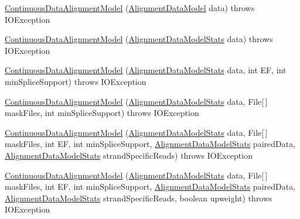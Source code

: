 \begin{DoxyCompactItemize}
\item 
\hyperlink{classbroad_1_1pda_1_1seq_1_1segmentation_1_1_continuous_data_alignment_model_a6fa2acc5a5e70dcb0b7d9f36c35c5f57}{Continuous\+Data\+Alignment\+Model} (\hyperlink{interfacebroad_1_1pda_1_1seq_1_1segmentation_1_1_alignment_data_model}{Alignment\+Data\+Model} data)  throws I\+O\+Exception
\item 
\hyperlink{classbroad_1_1pda_1_1seq_1_1segmentation_1_1_continuous_data_alignment_model_a954fd7962b745c8952dc27204ebe6252}{Continuous\+Data\+Alignment\+Model} (\hyperlink{classbroad_1_1pda_1_1seq_1_1segmentation_1_1_alignment_data_model_stats}{Alignment\+Data\+Model\+Stats} data)  throws I\+O\+Exception
\item 
\hyperlink{classbroad_1_1pda_1_1seq_1_1segmentation_1_1_continuous_data_alignment_model_adec2aa3724e353ed1f7678e17cb8e74a}{Continuous\+Data\+Alignment\+Model} (\hyperlink{classbroad_1_1pda_1_1seq_1_1segmentation_1_1_alignment_data_model_stats}{Alignment\+Data\+Model\+Stats} data, int E\+F, int min\+Splice\+Support)  throws I\+O\+Exception
\item 
\hyperlink{classbroad_1_1pda_1_1seq_1_1segmentation_1_1_continuous_data_alignment_model_a3cbdd60567c630a9741fb1b187aa8f2b}{Continuous\+Data\+Alignment\+Model} (\hyperlink{classbroad_1_1pda_1_1seq_1_1segmentation_1_1_alignment_data_model_stats}{Alignment\+Data\+Model\+Stats} data, File\mbox{[}$\,$\mbox{]} mask\+Files, int min\+Splice\+Support)  throws I\+O\+Exception
\item 
\hyperlink{classbroad_1_1pda_1_1seq_1_1segmentation_1_1_continuous_data_alignment_model_ad0d8dfa7ae363e2d07df5fd31ac3b3e2}{Continuous\+Data\+Alignment\+Model} (\hyperlink{classbroad_1_1pda_1_1seq_1_1segmentation_1_1_alignment_data_model_stats}{Alignment\+Data\+Model\+Stats} data, File\mbox{[}$\,$\mbox{]} mask\+Files, int E\+F, int min\+Splice\+Support, \hyperlink{classbroad_1_1pda_1_1seq_1_1segmentation_1_1_alignment_data_model_stats}{Alignment\+Data\+Model\+Stats} paired\+Data, \hyperlink{classbroad_1_1pda_1_1seq_1_1segmentation_1_1_alignment_data_model_stats}{Alignment\+Data\+Model\+Stats} strand\+Specific\+Reads)  throws I\+O\+Exception
\item 
\hyperlink{classbroad_1_1pda_1_1seq_1_1segmentation_1_1_continuous_data_alignment_model_a75f19ed69ba5c917dd852d1c7c8ade65}{Continuous\+Data\+Alignment\+Model} (\hyperlink{classbroad_1_1pda_1_1seq_1_1segmentation_1_1_alignment_data_model_stats}{Alignment\+Data\+Model\+Stats} data, File\mbox{[}$\,$\mbox{]} mask\+Files, int E\+F, int min\+Splice\+Support, \hyperlink{classbroad_1_1pda_1_1seq_1_1segmentation_1_1_alignment_data_model_stats}{Alignment\+Data\+Model\+Stats} paired\+Data, \hyperlink{classbroad_1_1pda_1_1seq_1_1segmentation_1_1_alignment_data_model_stats}{Alignment\+Data\+Model\+Stats} strand\+Specific\+Reads, boolean upweight)  throws I\+O\+Exception

\end{DoxyCompactItemize}
